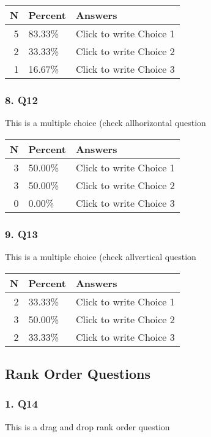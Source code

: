 \documentclass{article}\usepackage[]{graphicx}\usepackage[]{color}
\begin{document}
\begin{tabular}{r|l|l}
\hline
N & Percent & Answers\\
\hline
5 & 83.33\% & Click to write Choice 1\\
\hline
2 & 33.33\% & Click to write Choice 2\\
\hline
1 & 16.67\% & Click to write Choice 3\\
\hline
\end{tabular}


\hfill \break \hfill \break
\subsubsection*{8. Q12}
This is a multiple choice (check allhorizontal question

\begin{tabular}{r|l|l}
\hline
N & Percent & Answers\\
\hline
3 & 50.00\% & Click to write Choice 1\\
\hline
3 & 50.00\% & Click to write Choice 2\\
\hline
0 & 0.00\% & Click to write Choice 3\\
\hline
\end{tabular}


\hfill \break \hfill \break
\subsubsection*{9. Q13}
This is a multiple choice (check allvertical question

\begin{tabular}{r|l|l}
\hline
N & Percent & Answers\\
\hline
2 & 33.33\% & Click to write Choice 1\\
\hline
3 & 50.00\% & Click to write Choice 2\\
\hline
2 & 33.33\% & Click to write Choice 3\\
\hline
\end{tabular}


\hfill \break \hfill \break
\subsection*{Rank Order Questions}
\subsubsection*{1. Q14}
This is a drag and drop rank order question
\end{document}
